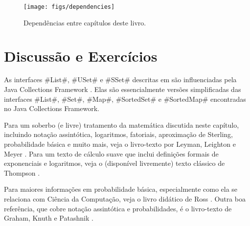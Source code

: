 \begin{figure}
  \begin{center}
    \texttt{[image: figs/dependencies]}
  \end{center}
  \caption{Dependências entre capítulos deste livro.}
\end{figure}

\section{Discussão e Exercícios}

As interfaces 
#List#, #USet# e #SSet# descritas em 
 são influenciadas pela Java Collections Framework
\cite{oracle_collections}.
%
Elas são essencialmente versões simplificadas das interfaces 
#List#, #Set#, #Map#, #SortedSet# e #SortedMap# encontradas no 
Java Collections Framework.  

Para um soberbo (e livre) tratamento da matemática discutida neste capítulo, incluindo notação assintótica, logaritmos, fatoriais, aproximação de Sterling, probabilidade básica e muito mais, veja o livro-texto por
Leyman, Leighton e Meyer \cite{llm11}.  
Para um texto de cálculo suave que inclui definições formais de exponenciais e logaritmos, veja o (disponível livremente) texto clássico de Thompson \cite{t14}.

Para maiores informações em probabilidade básica, especialmente como ela se relaciona com Ciência da Computação, veja o livro didático de Ross \cite{r01}.  
Outra boa referência, que cobre notação assintótica e probabilidades, é o livro-texto de Graham, Knuth e Patashnik \cite{gkp94}.


